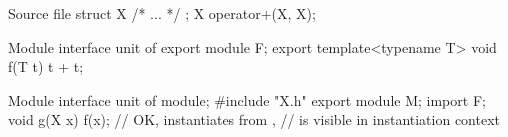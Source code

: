 \pnum
\begin{example}
\begin{codeblocktu}{Source file }
struct X { /* ... */ };
X operator+(X, X);
\end{codeblocktu}

\begin{codeblocktu}{Module interface unit of }
export module F;
export template<typename T>
void f(T t) {
  t + t;
}
\end{codeblocktu}

\begin{codeblocktu}{Module interface unit of }
module;
#include "X.h"
export module M;
import F;
void g(X x) {
  f(x);             // OK, instantiates  from ,
                    //  is visible in instantiation context
}
\end{codeblocktu}
\end{example}

